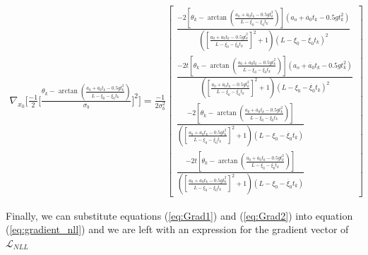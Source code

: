 \documentclass[11pt]{article}
\begin{document}
\begin{enumerate}[label=\alph*)]
\begin{align}
    \nabla_{x_0}\Big[\frac{-1}{2}\Big[\frac{\theta_k - \arctan(\frac{a_0 + \dot{a_0}t_k - 0.5gt_k^2}{L-\xi_0-\dot{\xi_0}t_k})}{\sigma_b}\Big]^2\Big]
    = \frac{-1}{2\sigma_b^2} \begin{bmatrix}
        \frac{-2[\theta_k - \arctan(\frac{a_0 + \dot{a_0}t_k - 0.5gt_k^2}{L-\xi_0-\dot{\xi_0}t_k})](a_o+\dot{a_0}t_k-0.5gt_k^2)}{([\frac{a_0 + \dot{a_0}t_k - 0.5gt_k^2}{L-\xi_0-\dot{\xi_0}t_k}]^2 + 1)(L-\xi_0-\dot{\xi_0}t_k)^2} \\
        \frac{-2t[\theta_k - \arctan(\frac{a_0 + \dot{a_0}t_k - 0.5gt_k^2}{L-\xi_0-\dot{\xi_0}t_k})](a_o+\dot{a_0}t_k-0.5gt_k^2)}{([\frac{a_0 + \dot{a_0}t_k - 0.5gt_k^2}{L-\xi_0-\dot{\xi_0}t_k}]^2 + 1)(L-\xi_0-\dot{\xi_0}t_k)^2} \\
        \frac{-2[\theta_k - \arctan(\frac{a_0 + \dot{a_0}t_k - 0.5gt_k^2}{L-\xi_0-\dot{\xi_0}t_k})]}{([\frac{a_0 + \dot{a_0}t_k - 0.5gt_k^2}{L-\xi_0-\dot{\xi_0}t_k}]^2 + 1)(L-\xi_0-\dot{\xi_0}t_k)} \\
        \frac{-2t[\theta_k - \arctan(\frac{a_0 + \dot{a_0}t_k - 0.5gt_k^2}{L-\xi_0-\dot{\xi_0}t_k})]}{([\frac{a_0 + \dot{a_0}t_k - 0.5gt_k^2}{L-\xi_0-\dot{\xi_0}t_k}]^2 + 1)(L-\xi_0-\dot{\xi_0}t_k)}
    \end{bmatrix}
    \label{eq:Grad2}
\end{align}

Finally, we can substitute equations (\ref{eq:Grad1}) and (\ref{eq:Grad2}) into equation (\ref{eq:gradient_nll}) and we are left with an expression
for the gradient vector of $\mathcal{L}_{NLL}$


\end{enumerate}
\end{document}

